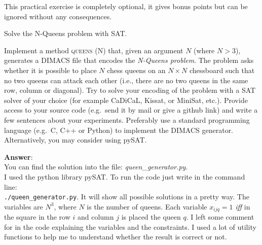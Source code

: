 \documentclass[addpoints,12pt]{exam}
\begin{document}
\begin{questions}
\newpage


\bonusquestion[15]
\vspace*{5pt}

This practical exercise is completely optional, it gives bonus points but can be ignored without any consequences.

Solve the N-Queens problem with SAT. 

Implement a method \textsc{queens (N)} that, given an argument $N$ (where $N>3$), generates a DIMACS file that
encodes the \textit{N-Queens problem}.
The problem asks whether it is possible to place $N$ chess queens on an $N \times N$ chessboard such
that no two queens can attack each other (i.e., there are no two queens in the same row, column or
diagonal).
Try to solve your encoding of the problem with a SAT solver of your choice (for example CaDiCaL, Kissat, or MiniSat, etc.).
Provide access to your source code (e.g.~send it by mail or give a github link) and write a few sentences about your experiments.
Preferably use a standard programming language (e.g.~C, C++ or Python) to implement the DIMACS generator.
Alternatively, you may consider using pySAT.

\textbf{Answer}: \\
You can find the solution into the file: \textit{queen\_generator.py}. \\
I used the python library pySAT. 
To run the code just write in the command line:\\ \texttt{./queen\_generator.py}.
It will show all possible solutions in a pretty way.
The variables are $N^{3}$, where $N$ is the number of queens.
Each variable $x_{ijq} = 1 $ \textit{iff} in the square in the row $i$ and column $j$ is placed the queen $q$.
I left some comment for in the code explaining the variables and the constraints.
I used a lot of utility functions to help me to understand whether the result is correct or not.

\end{questions}
\end{document}
